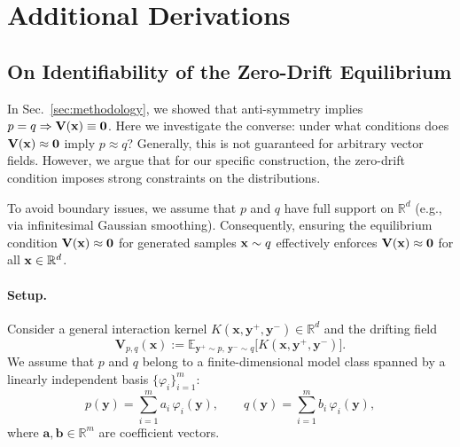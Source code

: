 \section{Additional Derivations}

\subsection{On Identifiability of the Zero-Drift Equilibrium}
\label{sec:theory_identifiability}

In Sec.~\ref{sec:methodology}, we showed that anti-symmetry implies $p=q \Rightarrow \mathbf{V}(\mathbf{x})\equiv \mathbf{0}$.
Here we investigate the converse: under what conditions does $\mathbf{V}(\mathbf{x})\approx \mathbf{0}$ imply $p\approx q$?
Generally, this is not guaranteed for arbitrary vector fields.
However, we argue that for our specific construction, the zero-drift condition imposes strong constraints on the distributions.

To avoid boundary issues, we assume that $p$ and $q$ have full support on $\mathbb{R}^d$ (e.g., via infinitesimal Gaussian smoothing). 
Consequently, ensuring the equilibrium condition $\mathbf{V}(\mathbf{x}) \approx \mathbf{0}$ for generated samples $\mathbf{x} \sim q$ effectively enforces $\mathbf{V}(\mathbf{x}) \approx \mathbf{0}$ for all $\mathbf{x} \in \mathbb{R}^d$.

\paragraph{Setup.}
Consider a general interaction kernel $K(\mathbf{x},\mathbf{y}^+,\mathbf{y}^-) \in \mathbb{R}^d$ and the drifting field
\begin{equation}
\mathbf{V}_{p,q}(\mathbf{x}) := \mathbb{E}_{\mathbf{y}^+\sim p,\ \mathbf{y}^-\sim q} \big[ K(\mathbf{x},\mathbf{y}^+,\mathbf{y}^-) \big].
\label{eq:V_general_K}
\end{equation}
We assume that $p$ and $q$ belong to a finite-dimensional model class spanned by a linearly independent basis $\{\varphi_i\}_{i=1}^m$:
\begin{equation}
p(\mathbf{y})=\sum_{i=1}^m a_i\,\varphi_i(\mathbf{y}),\qquad
q(\mathbf{y})=\sum_{i=1}^m b_i\,\varphi_i(\mathbf{y}),
\label{eq:pq_basis}
\end{equation}
where $\mathbf{a},\mathbf{b}\in\mathbb{R}^m$ are coefficient vectors.

